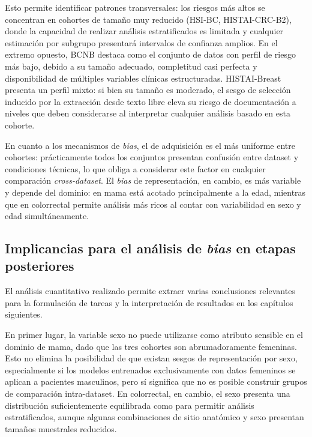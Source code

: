 Esto permite identificar patrones transversales: los riesgos más altos se concentran en cohortes de tamaño muy reducido (HSI-BC, HISTAI-CRC-B2), donde la capacidad de realizar análisis estratificados es limitada y cualquier estimación por subgrupo presentará intervalos de confianza amplios. En el extremo opuesto, BCNB destaca como el conjunto de datos con perfil de riesgo más bajo, debido a su tamaño adecuado, completitud casi perfecta y disponibilidad de múltiples variables clínicas estructuradas. HISTAI-Breast presenta un perfil mixto: si bien su tamaño es moderado, el sesgo de selección inducido por la extracción desde texto libre eleva su riesgo de documentación a niveles que deben considerarse al interpretar cualquier análisis basado en esta cohorte.

En cuanto a los mecanismos de \textit{bias}, el de adquisición es el más uniforme entre cohortes: prácticamente todos los conjuntos presentan confusión entre dataset y condiciones técnicas, lo que obliga a considerar este factor en cualquier comparación \textit{cross-dataset}. El \textit{bias} de representación, en cambio, es más variable y depende del dominio: en mama está acotado principalmente a la edad, mientras que en colorrectal permite análisis más ricos al contar con variabilidad en sexo y edad simultáneamente.

\subsection{Implicancias para el análisis de \textit{bias} en etapas posteriores}
\label{sec:implicancias_bias}

El análisis cuantitativo realizado permite extraer varias conclusiones relevantes para la formulación de tareas y la interpretación de resultados en los capítulos siguientes.

En primer lugar, la variable sexo no puede utilizarse como atributo sensible en el dominio de mama, dado que las tres cohortes son abrumadoramente femeninas. Esto no elimina la posibilidad de que existan sesgos de representación por sexo, especialmente si los modelos entrenados exclusivamente con datos femeninos se aplican a pacientes masculinos, pero sí significa que no es posible construir grupos de comparación intra-dataset. En colorrectal, en cambio, el sexo presenta una distribución suficientemente equilibrada como para permitir análisis estratificados, aunque algunas combinaciones de sitio anatómico y sexo presentan tamaños muestrales reducidos.

